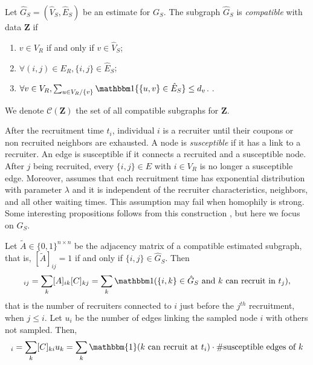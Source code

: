 \begin{definition}[Compatibility]
  Let $\hat{G}_S = (\hat{V}_S, \hat{E}_S)$ be an estimate for $G_S$. The 
  subgraph $\hat{G}_S$ is {\em compatible} with data $\boldsymbol{Z}$ if 
  \begin{enumerate}
    \item $v \in V_R$ if and only if $v \in \hat{V}_S$;
    \item $\forall (i,j) \in E_R, \{i,j\} \in \hat{E}_S$;
    \item $\forall v \in V_R, \sum_{u \in V_R / \{v\}} \ind\{\{u,v\} \in
    \hat{E}_S\} \le d_v$. \cite[p. 197]{crawford2016}.
  \end{enumerate}
  We denote $\mathcal{C}(\boldsymbol{Z})$ the set of all compatible subgraphs
  for $\boldsymbol{Z}$. 
\end{definition}

After the recruitment time $t_i$, individual $i$ is a recruiter until 
their coupons or non recruited neighbors are exhausted. 
A node is {\em susceptible} if it has a link to a recruiter. An edge is
susceptible if it connects a recruited and a susceptible node. After $j$ being
recruited, every $\{i,j\} \in E$ with $i \in V_R$ is no longer a susceptible
edge. Moreover, \textcite[p. 194]{crawford2016} assumes that each recruitment time
has exponential distribution with parameter $\lambda$ and it is independent of
the recruiter characteristics, neighbors, and all other waiting times. This assumption may
fail when homophily is strong. Some interesting propositions follows from this
construction \cite[p. 195]{crawford2016}, but here we focus on $G_S$. 

Let $\tilde{A} \in \{0,1\}^{n \times n}$ be the adjacency matrix of a  
compatible estimated subgraph, that is, $[\tilde{A}]_{ij} = 1$ if and only 
if $\{i,j\} \in \hat{G}_S$.
Then 
\begin{equation*}
  [AC]_{ij} = \sum_{k} [A]_{ik}[C]_{kj} = \sum_{k} \ind(\{i,k\} \in \hat{G}_S \text{ and } k \text{ can recruit in } t_j),  
\end{equation*}
that is the number of recruiters connected to $i$ just before the $j^{th}$
recruitment, when $j \le i$. Let $u_i$ be the number of edges linking the
sampled node $i$ with others not sampled. Then,
\begin{equation*}
  [C^T u]_{i} = \sum_{k} [C]_{ki} u_k  = \sum_k \mathbbm{1}(k \text{ can recruit at } t_i)\cdot \#\text{susceptible edges of }k 
\end{equation*}

